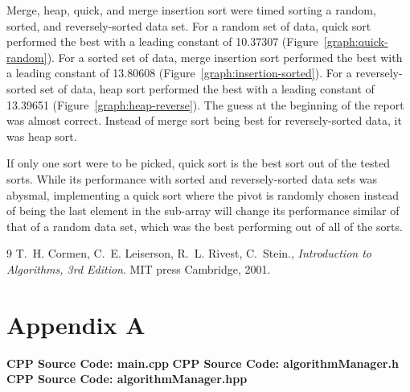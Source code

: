 \documentclass[onecolumn, letterpaper, 12pt]{article}
\begin{document}
	Merge, heap, quick, and merge insertion sort were timed sorting a random, sorted, and reversely-sorted data set. For a random set of data, quick sort performed the best with a leading constant of 10.37307 (Figure~\ref{graph:quick-random}). For a sorted set of data, merge insertion sort performed the best with a leading constant of 13.80608 (Figure~\ref{graph:insertion-sorted}). For a reversely-sorted set of data, heap sort performed the best with a leading constant of 13.39651 (Figure~\ref{graph:heap-reverse}). The guess at the beginning of the report was almost correct. Instead of merge sort being best for reversely-sorted data, it was heap sort.
	
	If only one sort were to be picked, quick sort is the best sort out of the tested sorts. While its performance with sorted and reversely-sorted data sets was abysmal, implementing a quick sort where the pivot is randomly chosen instead of being the last element in the sub-array will change its performance similar of that of a random data set, which was the best performing out of all of the sorts.
	

\begin{thebibliography}{9}
	T.~H. Cormen, C.~E. Leiserson, R.~L. Rivest, C.~Stein.,
	\emph{{Introduction to Algorithms, 3rd Edition}}.
	MIT press Cambridge, 2001.
\end{thebibliography}
\newpage
\section*{Appendix A}
	\large{\textbf{CPP Source Code: main.cpp}}
	\tiny{}
	\large{\textbf{CPP Source Code: algorithmManager.h}}
	\tiny{}
	\large{\textbf{CPP Source Code: algorithmManager.hpp}}
	\tiny{}
\end{document}
